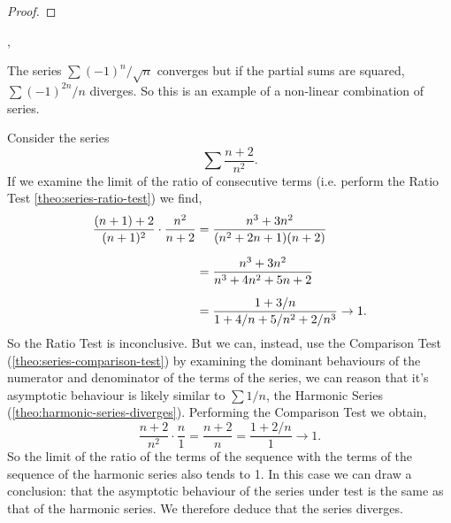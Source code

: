 \documentclass[../MathsNotesBase.tex]{subfiles}
\begin{document}
{		
		
		\bigskip
		\begin{proof}
		\end{proof}
		
	
		\sep
		\begin{exe}
			\ex The series ${ \sum (-1)^n/\sqrt{n} }$ converges but if the partial sums are squared, ${ \sum (-1)^{2n}/n }$ diverges. So this is an example of a non-linear combination of series.
			\label{ex:absolutely-convergent-series-whose-square-diverges}
			
			\biggerskip
			\ex Consider the series
				\[ \sum \frac{n + 2}{n^2}. \]
				If we examine the limit of the ratio of consecutive terms (i.e. perform the Ratio Test \autoref{theo:series-ratio-test}) we find, 
				\[\begin{aligned}
					\frac{(n+1) + 2}{(n+1)^2} \cdot \frac{n^2}{n+2} &= \frac{n^3 + 3n^2}{(n^2 + 2n + 1)(n + 2)} \nn
					&= \frac{n^3 + 3n^2}{n^3 + 4n^2 + 5n + 2} \nn
					&= \frac{1 + 3/n}{1 + 4/n + 5/n^2 + 2/n^3} \to 1.
				\end{aligned}\]
				So the Ratio Test is inconclusive. But we can, instead, use the Comparison Test (\autoref{theo:series-comparison-test}) by examining the dominant behaviours of the numerator and denominator of the terms of the series, we can reason that it's asymptotic behaviour is likely similar to ${ \sum 1/n }$, the Harmonic Series (\autoref{theo:harmonic-series-diverges}). Performing the Comparison Test we obtain,
				\[ \frac{n + 2}{n^2} \cdot \frac{n}{1} = \frac{n + 2}{n} = \frac{1 + 2/n}{1} \to 1. \]
				So the limit of the ratio of the terms of the sequence with the terms of the sequence of the harmonic series also tends to 1. In this case we can draw a conclusion: that the asymptotic behaviour of the series under test is the same as that of the harmonic series. We therefore deduce that the series diverges.
			

\end{exe}}
\end{document}
